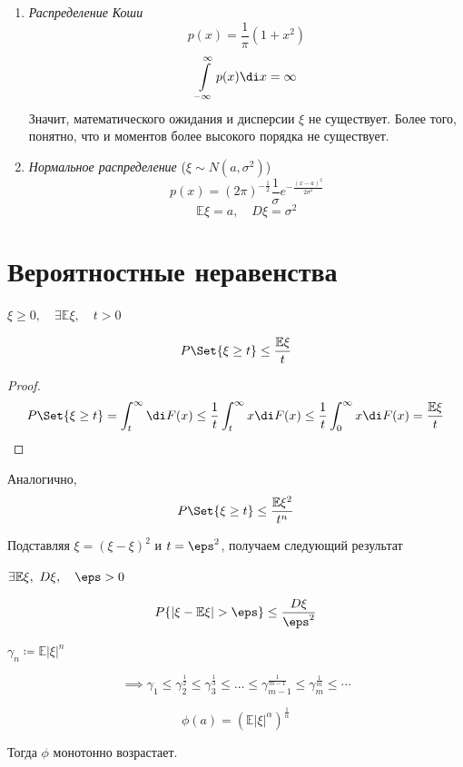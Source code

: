 \begin{enumerate}
		Плотность $ \xi $ имеет вид
		$$ p(x) =
		\begin{cases}
			0, \quad x < 0, \\
			\frac1\lambda e^{-\frac x \lambda}, \quad x \ge 0
		\end{cases} $$
		$$ \mathbb E \xi = \lambda, \quad D\xi = \lambda^2 $$
	\item \emph{Распределение Коши}
		$$ p(x) = \frac1\pi (1 + x^2) $$
		$$ \int\limits_{-\infty}^\infty p(x) \di x = \infty $$
		Значит, математического ожидания и дисперсии $ \xi $ не существует.
		Более того, понятно, что и моментов более высокого порядка не существует.
	\item \emph{Нормальное распределение} ($ \xi \sim N(a, \sigma^2) $)
		$$ p(x) = (2\pi)^{-\frac12} \frac1\sigma e^{-\frac{(x - a)^2}{2\sigma^2}} $$
		$$ \mathbb E \xi = a, \quad D \xi = \sigma^2 $$
\end{enumerate}

\section{Вероятностные неравенства}

\begin{lemma}[Чебышёва]
	$ \xi \ge 0, \quad \exists \mathbb E \xi, \quad t > 0 $

	$$ P\Set{\xi \ge t} \le \frac{\mathbb E \xi}t $$
\end{lemma}

\begin{proof}
	$$ P\Set{\xi \ge t} = \int_t^\infty \di F(x) \le \frac1t \int_t^\infty x \di F(x) \le
	\frac1t \int_0^\infty x \di F(x) = \frac{\mathbb E \xi}t $$
\end{proof}

\begin{remark}
	Аналогично,
	$$ P\Set{\xi \ge t} \le \frac{\mathbb E\xi^2}{t^n} $$
\end{remark}

Подставляя $ \xi = (\xi - \mathbb \xi)^2 $ и $ t = \eps^2 $, получаем следующий результат

\begin{statement}
	$ \exists \mathbb E \xi, ~ D \xi, \quad \eps > 0 $

	$$ P\{|\xi - \mathbb E\xi| > \eps\} \le \frac{D\xi}{\eps^2} $$
\end{statement}

\begin{statement}
	$ \gamma_n \coloneq \mathbb E |\xi|^n $

	$$ \implies \gamma_1 \le \gamma_2^{\frac12} \le \gamma_3^{\frac13} \le \dots \le
	\gamma_{m - 1}^{\frac1{m - 1}} \le \gamma_m^{\frac1m} \le \dotsb $$

	$$ \phi(a) = (\mathbb E|\xi|^\alpha)^{\frac1\alpha} $$

	Тогда $ \phi $ монотонно возрастает.
\end{statement}


